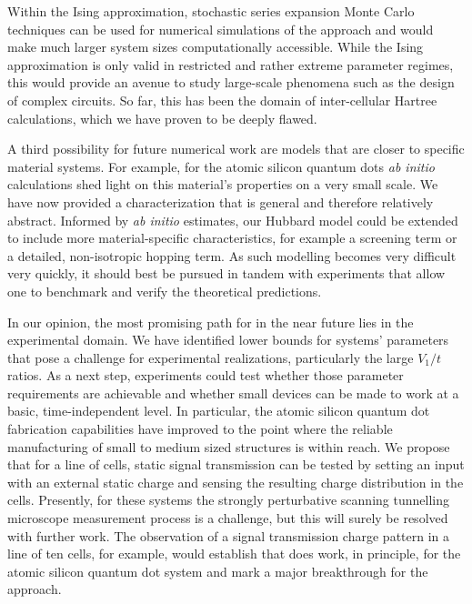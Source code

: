 Within the Ising approximation, stochastic series expansion Monte Carlo
techniques can be used for numerical simulations of the  approach and
would make much larger system sizes computationally accessible. While the Ising
approximation is only valid in restricted and rather extreme parameter regimes,
this would provide an avenue to study large-scale phenomena such as the design
of complex  circuits. So far, this has been the domain of
inter-cellular Hartree calculations, which we have proven to be deeply flawed.

A third possibility for future numerical work are models that are closer to
specific material systems. For example, for the atomic silicon quantum dots
\emph{ab initio} calculations shed light on this material's properties on a very
small scale. We have now provided a  characterization that is general
and therefore relatively abstract. Informed by \emph{ab initio} estimates, our
Hubbard model could be extended to include more material-specific
characteristics, for example a screening term or a detailed, non-isotropic
hopping term. As such modelling becomes very difficult very quickly, it should
best be pursued in tandem with experiments that allow one to benchmark and
verify the theoretical predictions.

In our opinion, the most promising path for  in the near future lies
in the experimental domain. We have identified lower bounds for 
systems' parameters that pose a challenge for experimental realizations,
particularly the large $V_1/t$ ratios. As a next step, experiments could test
whether those parameter requirements are achievable and whether small 
devices can be made to work at a basic, time-independent level. In particular,
the atomic silicon quantum dot fabrication capabilities have improved to the
point where the reliable manufacturing of small to medium sized structures is
within reach. We propose that for a line of cells, static signal transmission
can be tested by setting an input with an external static charge and sensing the
resulting charge distribution in the cells. Presently, for these systems the
strongly perturbative scanning tunnelling microscope measurement process is a
challenge, but this will surely be resolved with further work. The observation
of a signal transmission charge pattern in a line of ten cells, for example,
would establish that  does work, in principle, for the atomic silicon
quantum dot system and mark a major breakthrough for the  approach.
